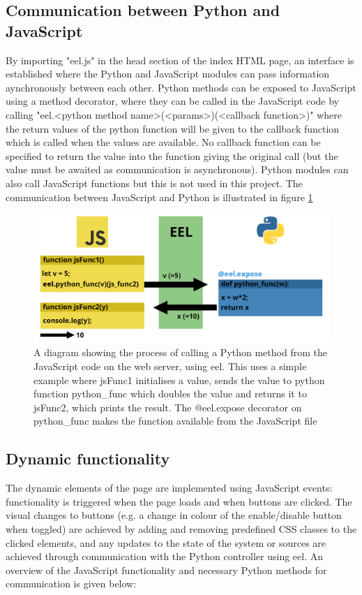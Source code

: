 \documentclass{l4proj}
\begin{document}
\subsection{Communication between Python and JavaScript}
By importing "eel.js" in the head section of the index HTML page, an interface is established where the Python and JavaScript modules can pass information aynchronously between each other. Python methods can be exposed to JavaScript using a method decorator, where they can be called in the JavaScript code by calling "eel.<python method name>(<params>)(<callback function>)" where the return values of the python function will be given to the callback function which is called when the values are available. No callback function can be specified to return the value into the function giving the original call (but the value must be awaited as communication is asynchronous). Python modules can also call JavaScript functions but this is not used in this project. The communication between JavaScript and Python is illustrated in figure \ref{fig:eel-communication}

\begin{figure}[!ht]
\includegraphics[width=\textwidth]{images/eel-communication.png}
\caption{A diagram showing the process of calling a Python method from the JavaScript code on the web server, using eel. This uses a simple example where jsFunc1 initialises a value, sends the value to python function python\_func which doubles the value and returns it to jsFunc2, which prints the result. The @eel.expose decorator on python\_func makes the function available from the JavaScript file}
\label{fig:eel-communication}
\end{figure}

\subsection{Dynamic functionality}
The dynamic elements of the page are implemented using JavaScript events: functionality is triggered when the page loads and when buttons are clicked. The visual changes to buttons (e.g. a change in colour of the enable/disable button when toggled) are achieved by adding and removing predefined CSS classes to the clicked elements, and any updates to the state of the system or sources are achieved through communication with the Python controller using eel. An overview of the JavaScript functionality and necessary Python methods for communication is given below:
\end{document}
